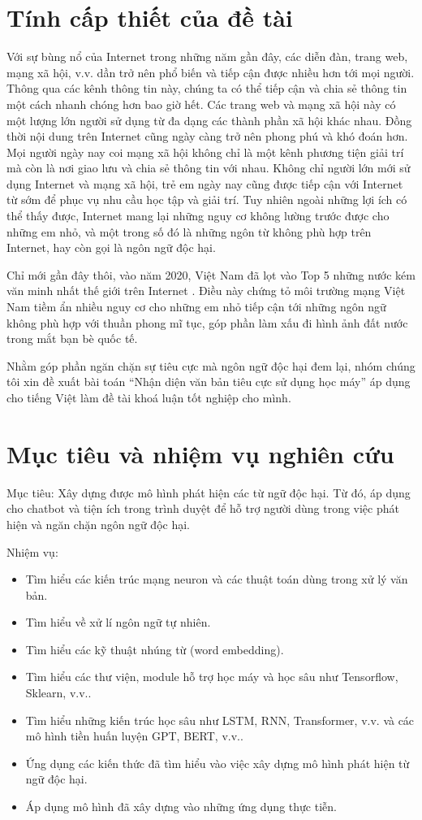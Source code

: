 \section{Tính cấp thiết của đề tài}
Với sự bùng nổ của Internet trong những năm gần đây, các diễn đàn, trang web, mạng xã hội, v.v. dần trở nên phổ biến và tiếp cận được nhiều hơn tới mọi người. Thông qua các kênh thông tin này, chúng ta có thể tiếp cận và chia sẻ thông tin một cách nhanh chóng hơn bao giờ hết. Các trang web và mạng xã hội này có một lượng lớn người sử dụng từ đa dạng các thành phần xã hội khác nhau. Đồng thời nội dung trên Internet cũng ngày càng trở nên phong phú và khó đoán hơn. Mọi người ngày nay coi mạng xã hội không chỉ là một kênh phương tiện giải trí mà còn là nơi giao lưu và chia sẻ thông tin với nhau. Không chỉ người lớn mới sử dụng Internet và mạng xã hội, trẻ em ngày nay cũng được tiếp cận với Internet từ sớm để phục vụ nhu cầu học tập và giải trí. Tuy nhiên ngoài những lợi ích có thể thấy được, Internet mang lại những nguy cơ không lường trước được cho những em nhỏ, và một trong số đó là những ngôn từ không phù hợp trên Internet, hay còn gọi là ngôn ngữ độc hại.

Chỉ mới gần đây thôi, vào năm 2020, Việt Nam đã lọt vào Top 5 những nước kém văn minh nhất thế giới trên Internet \cite{webpage28}. Điều này chứng tỏ môi trường mạng Việt Nam tiềm ẩn nhiều nguy cơ cho những em nhỏ tiếp cận tới những ngôn ngữ không phù hợp với thuần phong mĩ tục, góp phần làm xấu đi hình ảnh đất nước trong mắt bạn bè quốc tế.

Nhằm góp phần ngăn chặn sự tiêu cực mà ngôn ngữ độc hại đem lại, nhóm chúng tôi xin đề xuất bài toán ``Nhận diện văn bản tiêu cực sử dụng học máy'' áp dụng cho tiếng Việt làm đề tài khoá luận tốt nghiệp cho mình.

\section{Mục tiêu và nhiệm vụ nghiên cứu}
Mục tiêu: Xây dựng được mô hình phát hiện các từ ngữ độc hại. Từ đó, áp dụng cho chatbot và tiện ích trong trình duyệt để hỗ trợ người dùng trong việc phát hiện và ngăn chặn ngôn ngữ độc hại.

Nhiệm vụ:
\begin{itemize}
    \item Tìm hiểu các kiến trúc mạng neuron và các thuật toán dùng trong xử lý văn bản.
    \item Tìm hiểu về xử lí ngôn ngữ tự nhiên.
    \item Tìm hiểu các kỹ thuật nhúng từ (word embedding).
    \item Tìm hiểu các thư viện, module hỗ trợ học máy và học sâu như Tensorflow, Sklearn, v.v..
    \item Tìm hiểu những kiến trúc học sâu như LSTM, RNN, Transformer, v.v. và các mô hình tiền huấn luyện GPT, BERT, v.v..
    \item Ứng dụng các kiến thức đã tìm hiểu vào việc xây dựng mô hình phát hiện từ ngữ độc hại.
    \item Áp dụng mô hình đã xây dựng vào những ứng dụng thực tiễn.
\end{itemize}


